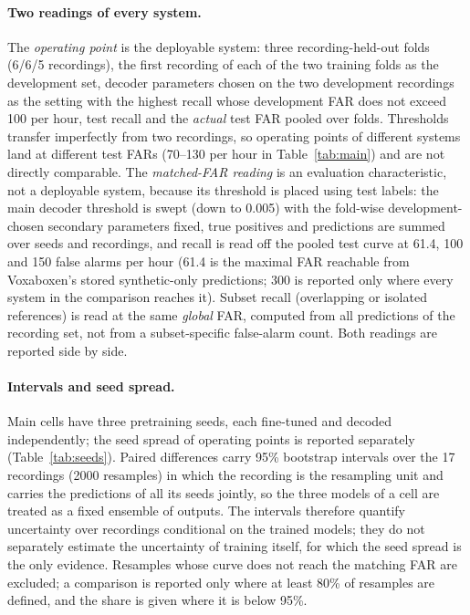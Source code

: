 \documentclass[10pt,twocolumn]{article}
\begin{document}
\paragraph{Two readings of every system.} The \emph{operating point} is the deployable system: three recording-held-out folds (6/6/5 recordings), the first recording of each of the two training folds as the development set, decoder parameters chosen on the two development recordings as the setting with the highest recall whose development FAR does not exceed 100 per hour, test recall and the \emph{actual} test FAR pooled over folds. Thresholds transfer imperfectly from two recordings, so operating points of different systems land at different test FARs (70--130 per hour in Table~\ref{tab:main}) and are not directly comparable. The \emph{matched-FAR reading} is an evaluation characteristic, not a deployable system, because its threshold is placed using test labels: the main decoder threshold is swept (down to 0.005) with the fold-wise development-chosen secondary parameters fixed, true positives and predictions are summed over seeds and recordings, and recall is read off the pooled test curve at 61.4, 100 and 150 false alarms per hour (61.4 is the maximal FAR reachable from Voxaboxen's stored synthetic-only predictions; 300 is reported only where every system in the comparison reaches it). Subset recall (overlapping or isolated references) is read at the same \emph{global} FAR, computed from all predictions of the recording set, not from a subset-specific false-alarm count. Both readings are reported side by side.
\paragraph{Intervals and seed spread.} Main cells have three pretraining seeds, each fine-tuned and decoded independently; the seed spread of operating points is reported separately (Table~\ref{tab:seeds}). Paired differences carry 95\% bootstrap intervals over the 17 recordings (2000 resamples) in which the recording is the resampling unit and carries the predictions of all its seeds jointly, so the three models of a cell are treated as a fixed ensemble of outputs. The intervals therefore quantify uncertainty over recordings conditional on the trained models; they do not separately estimate the uncertainty of training itself, for which the seed spread is the only evidence. Resamples whose curve does not reach the matching FAR are excluded; a comparison is reported only where at least 80\% of resamples are defined, and the share is given where it is below 95\%.
\end{document}

